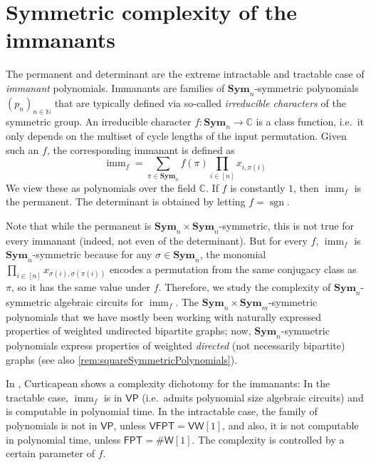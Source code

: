 \documentclass[11pt, DIV=15]{scrarticle}
\theoremstyle{definition}
\theoremstyle{plain}
\theoremstyle{remark}
\newcommand{\Sym}{\mathbf{Sym}}
\newcommand{\bbN}{\mathbb{N}}
\DeclareMathOperator{\imm}{imm}
\DeclareMathOperator{\sgn}{sgn}
\newcommand{\VP}{\mathsf{VP}}
\newcommand{\VFPT}{\mathsf{VFPT}}
\newcommand{\VW}{\mathsf{VW}[1]}
\newcommand{\FPT}{\mathsf{FPT}}
\newcommand{\sharpW}{\#\mathsf{W}[1]}
\begin{document}
	
	\section{Symmetric complexity of the immanants}
	\label{sec:immanants}
	The permanent and determinant are the extreme intractable and tractable case of \emph{immanant} polynomials. Immanants are families of $\Sym_n$-symmetric polynomials $(p_n)_{n \in \bbN}$ that are typically defined via so-called \emph{irreducible characters} of the symmetric group. An irreducible character $f\colon \Sym_n \to \mathbb{C}$ is a class function, i.e.\ it only depends on the multiset of cycle lengths of the input permutation. Given such an $f$, the corresponding immanant is defined as
	\[
	\imm_{f} = \sum_{\pi \in \Sym_n} f(\pi) \prod_{i \in [n]} x_{i,\pi(i)}
	\]
	We view these as polynomials over the field $\mathbb{C}$. 
	If $f$ is constantly $1$, then $\imm_f$ is the permanent. The determinant is obtained by letting $f = \sgn$.
	
	Note that while the permanent is $\Sym_n \times
        \Sym_n$-symmetric, this is not true for every immanant
        (indeed, not even of the determinant).
	But for every $f$, $\imm_{f}$ is $\Sym_n$-symmetric because for any $\sigma \in \Sym_n$, the monomial $\prod_{i \in [n]} x_{\sigma(i),\sigma(\pi(i))}$ encodes a permutation from the same conjugacy class as $\pi$, so it has the same value under $f$. Therefore, we study the complexity of $\Sym_n$-symmetric algebraic circuits for $\imm_{f}$. 
	The $\Sym_n \times \Sym_m$-symmetric polynomials that we have mostly been working with naturally expressed properties of weighted undirected bipartite graphs; now, $\Sym_n$-symmetric polynomials express properties of weighted \emph{directed} (not necessarily bipartite) graphs (see also \cref{rem:squareSymmetricPolynomials}).
	
	In \cite{curticapean2021full}, Curticapean shows a complexity dichotomy for the immanants: In the tractable case, $\imm_{f}$ is in $\VP$ (i.e.\ admits polynomial size algebraic circuits) and is computable in polynomial time. In the intractable case, the family of polynomials is not in $\VP$, unless $\VFPT = \VW$, and also, it is not computable in polynomial time, unless $\FPT = \sharpW$. The complexity is controlled by a certain parameter of $f$. 
	
\end{document}
